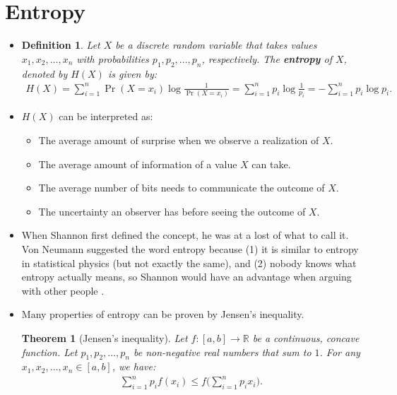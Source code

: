 \documentclass[10pt]{article}
\newtheorem{theorem}[lemma]{Theorem}
\newtheorem{definition}[lemma]{Definition}
\newcommand{\Real}{\mathbb{R}}
\begin{document}
  \section{Entropy}

  \begin{itemize}
  	\item \begin{definition}
  	Let $X$ be a discrete random variable that takes values $x_1, x_2, \dotsc, x_n$ with probabilities $p_1, p_2, \dotsc, p_n$, respectively. The \textbf{entropy} of $X$, denoted by $H(X)$ is given by:
  	\begin{align*}
  		H(X) 
  		= \sum_{i=1}^n \Pr(X=x_i) \log \frac{1}{\Pr(X=x_i)}
  		= \sum_{i=1}^n p_i \log \frac{1}{p_i}
  		= -\sum_{i=1}^n p_i \log p_i.
  	\end{align*}	
  	\end{definition}
  	
  	\item $H(X)$ can be interpreted as:
  	\begin{itemize}
  		\item The average amount of surprise when we observe a realization of $X$.
  		\item The average amount of information of a value $X$ can take.
  		\item The average number of bits needs to communicate the outcome of $X$.
  		\item The uncertainty an observer has before seeing the outcome of $X$.
  	\end{itemize}

  	\item When Shannon first defined the concept, he was at a lost of what to call it. Von Neumann suggested the word entropy because (1) it is similar to entropy in statistical physics (but not exactly the same), and (2) nobody knows what entropy actually means, so Shannon would have an advantage when arguing with other people \cite{Galvin:2014}.

  	\item Many properties of entropy can be proven by Jensen's inequality.

  	\begin{theorem}[Jensen's inequality]
  		Let $f: [a,b] \rightarrow \Real$ be a continuous, concave function. Let $p_1, p_2, \dotsc, p_n$ be non-negative real numbers that sum to $1$. For any $x_1, x_2, \dotsc, x_n \in [a,b]$, we have:
  		\begin{align*}
  			\sum_{i=1}^n p_i f(x_i) \leq f\bigg( \sum_{i=1}^n p_i x_i \bigg).
  		\end{align*}
  	\end{theorem}
  	 

\end{itemize}
\end{document}

